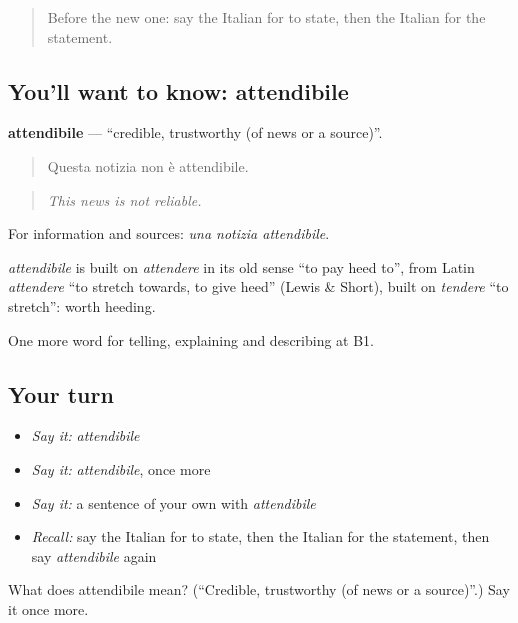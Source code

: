 \begin{quote}
Before the new one: say the Italian for to state, then the Italian for the statement.
\end{quote}

\subsection*{You'll want to know: attendibile}
\textbf{attendibile} — \textquotedblleft{}credible, trustworthy (of news or a source)\textquotedblright{}.

\begin{quote}
Questa notizia non è attendibile.
\end{quote}

\begin{quote}
\emph{This news is not reliable.}
\end{quote}

For information and sources: \emph{una notizia attendibile}.

\begin{cousinweb}
\emph{attendibile} is built on \emph{attendere} in its old sense \textquotedblleft{}to pay heed to\textquotedblright{}, from Latin \emph{attendere} \textquotedblleft{}to stretch towards, to give heed\textquotedblright{} (Lewis \& Short), built on \emph{tendere} \textquotedblleft{}to stretch\textquotedblright{}: worth heeding.
\end{cousinweb}

\begin{grammarlens}[title={What you've built}]
One more word for telling, explaining and describing at B1.
\end{grammarlens}

\subsection*{Your turn}
\begin{itemize}
\raggedright
  \item \emph{Say it:} \emph{attendibile}
  \item \emph{Say it:} \emph{attendibile}, once more
  \item \emph{Say it:} a sentence of your own with \emph{attendibile}
  \item \emph{Recall:} say the Italian for to state, then the Italian for the statement, then say \emph{attendibile} again
\end{itemize}

\begin{tcolorbox}[breakable,colback=teal!4,colframe=teal!35!black,title={Before you move on}]
What does attendibile mean? (\textquotedblleft{}Credible, trustworthy (of news or a source)\textquotedblright{}.) Say it once more.
\end{tcolorbox}
